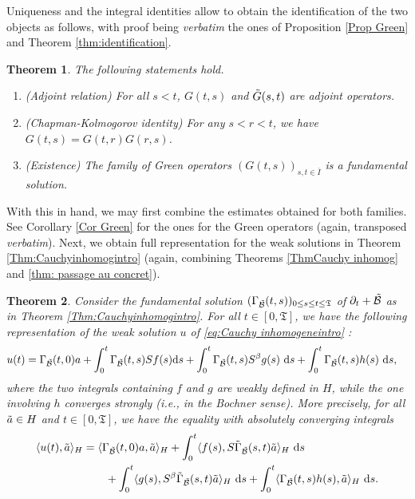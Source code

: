 \documentclass[11pt, letterpaper]{amsart}
\newtheorem{thm}{Theorem}[section]
\theoremstyle{definition}
\theoremstyle{remark}
\numberwithin{equation}{section}
\begin{document}
Uniqueness and the integral identities allow to obtain the identification of the two objects as follows, with proof being \textit{verbatim} the ones of Proposition \ref{Prop Green}  and Theorem \ref{thm:identification}.

\begin{thm}\label{thm:Green-FSintro} The following statements hold.
\begin{enumerate}
    \item (Adjoint relation) For all $s <t $, $G(t,s)$ and $\Tilde{G}(s,t)$ are  adjoint operators.
    \item  (Chapman-Kolmogorov identity) For any $s < r <t $, we have $G(t,s)=G(t,r)G(r,s)$.
 \item (Existence) The family of Green operators $(G(t,s))_{s,t\in \overline{I}}$ is a fundamental solution.
    \end{enumerate}
 \end{thm}
 
 
 
 With this in hand, we may first combine the estimates obtained for both families. See Corollary \ref{Cor Green} for the ones for the Green operators (again, transposed \textit{verbatim}). Next, we obtain full representation for the weak solutions in Theorem \ref{Thm:Cauchyinhomogintro} (again,  combining Theorems \ref{ThmCauchy inhomog} and \ref{thm: passage au concret}). 
 
   
\begin{thm}\label{Thm:FSCauchyintro} Consider the fundamental solution $(\Gamma_{\Tilde{\mathcal{B}}}(t,s))_{0\le s\le t\le \mathfrak{T}}$ of $\partial_t  +\Tilde{\mathcal{B}}$ as in Theorem \ref{Thm:Cauchyinhomogintro}.
For all $t \in [0,\mathfrak{T}]$, we have the following representation of the weak solution $u$ of  \eqref{eq:Cauchy inhomogeneintro} : 
        \begin{align*}
            u(t)=\Gamma_{\Tilde{\mathcal{B}}}(t,0)a&+\int_{0}^{t}\Gamma_{\Tilde{\mathcal{B}}}(t,s)Sf(s)\mathrm ds 
+\int_{0}^{t}\Gamma_{\Tilde{\mathcal{B}}}(t,s)S^\beta g(s) \ \mathrm ds+\int_{0}^{t}\Gamma_{\Tilde{\mathcal{B}}}(t,s)h(s) \ \mathrm ds, 
        \end{align*}
         where the two integrals containing ${f}$ and ${g}$ are weakly defined in $H$, while the one involving $h$ converges strongly (i.e., in the Bochner sense). More precisely, for all $\Tilde{a} \in H$ and $t \in [0,\mathfrak{T}]$, we have the equality with absolutely converging integrals
        \begin{align*}
            \langle u(t) , \Tilde{a}\rangle_H &
            = \langle \Gamma_{\Tilde{\mathcal{B}}}(t,0)a , \Tilde{a}\rangle_H +  \int_{0}^{t} \langle {f}(s) ,  S \Tilde{\Gamma}_{\Tilde{\mathcal{B}}}(s,t)\Tilde{a}\rangle_H \ \mathrm ds  
       \\
       &
           \qquad +\int_{0}^{t} \langle {g}(s) ,  S^\beta \Tilde{\Gamma}_{\Tilde{\mathcal{B}}}(s,t)\Tilde{a}\rangle_H \ \mathrm ds+\int_{0}^{t} \langle \Gamma_{\Tilde{\mathcal{B}}}(t,s) h(s) , \Tilde{a}\rangle_H \  \mathrm ds.
        \end{align*}
\end{thm}
\end{document}
